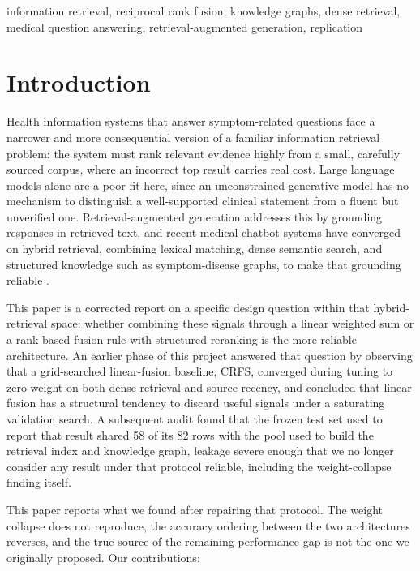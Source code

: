 \documentclass[10pt,conference]{IEEEtran}
\begin{document}
\begin{IEEEkeywords}
information retrieval, reciprocal rank fusion, knowledge graphs, dense retrieval, medical question answering, retrieval-augmented generation, replication
\end{IEEEkeywords}

\section{Introduction}

Health information systems that answer symptom-related questions face a narrower and more consequential version of a familiar information retrieval problem: the system must rank relevant evidence highly from a small, carefully sourced corpus, where an incorrect top result carries real cost. Large language models alone are a poor fit here, since an unconstrained generative model has no mechanism to distinguish a well-supported clinical statement from a fluent but unverified one. Retrieval-augmented generation addresses this by grounding responses in retrieved text, and recent medical chatbot systems have converged on hybrid retrieval, combining lexical matching, dense semantic search, and structured knowledge such as symptom-disease graphs, to make that grounding reliable \cite{lachenmayer2026,shin2025,nikam2024}.

This paper is a corrected report on a specific design question within that hybrid-retrieval space: whether combining these signals through a linear weighted sum or a rank-based fusion rule with structured reranking is the more reliable architecture. An earlier phase of this project answered that question by observing that a grid-searched linear-fusion baseline, CRFS, converged during tuning to zero weight on both dense retrieval and source recency, and concluded that linear fusion has a structural tendency to discard useful signals under a saturating validation search. A subsequent audit found that the frozen test set used to report that result shared 58 of its 82 rows with the pool used to build the retrieval index and knowledge graph, leakage severe enough that we no longer consider any result under that protocol reliable, including the weight-collapse finding itself.

This paper reports what we found after repairing that protocol. The weight collapse does not reproduce, the accuracy ordering between the two architectures reverses, and the true source of the remaining performance gap is not the one we originally proposed. Our contributions:
\end{document}
